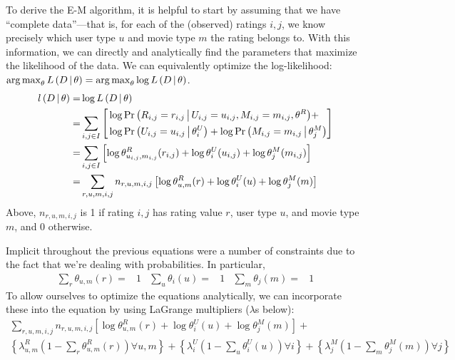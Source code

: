 \documentclass{article}
\begin{document}
To derive the E-M algorithm, it is helpful to start by assuming that
we have ``complete data''---that is, for each of the (observed)
ratings $i,j$, we know precisely which user type $u$ and movie type
$m$ the rating belongs to. With this information, we can directly and
analytically find the parameters that maximize the likelihood of the
data. We can equivalently optimize the log-likelihood: $\operatorname*{arg\,max}_\theta
{\ensuremath{ L \left( D \,\middle|\, \theta \right) }} = \operatorname*{arg\,max}_\theta \log {\ensuremath{ L \left( D \,\middle|\, \theta \right) }}$.
\begin{align}
  {\ensuremath{ l \left( D \,\middle|\, \theta \right) }} =& \log {\ensuremath{ L \left( D \,\middle|\, \theta \right) }} \\
  =& \sum_{i,j \in I} \left[
    \begin{aligned}
      & \log {{\Pr \left(  R_{i,j} = r_{i,j} \,\middle|\, U_{i,j} = u_{i,j}, M_{i,j} = m_{i,j},
        \theta^R  \right)}} + \\
      & \log {{\Pr \left(  U_{i,j} = u_{i,j} \,\middle|\, \theta^U_i  \right)}} +  \log {{\Pr \left(  M_{i,j} = m_{i,j} \,\middle|\, \theta^M_j  \right)}}
    \end{aligned}
  \right] \\
  =& \sum_{i,j \in I} \left[
    \log \theta^R_{u_{i,j},m_{i,j}}(r_{i,j}) +
    \log \theta^U_i(u_{i,j}) +
    \log \theta^M_j(m_{i,j})
  \right] \\
  =& \sum_{r,u,m,i,j} n_{r,u,m,i,j} \left[
    \log \theta^R_{u,m}(r) + \log \theta^U_i(u) + \log \theta^M_j(m)
  \right]
\end{align}
Above, $n_{r,u,m,i,j}$ is 1 if rating $i,j$ has rating value $r$, user
type $u$, and movie type $m$, and 0 otherwise.

Implicit throughout the previous equations were a number of
constraints due to the fact that we're dealing with probabilities. In
particular,
\begin{align}
\sum_r \theta_{u,m}(r) =& 1 &
\sum_u \theta_i(u) =& 1 &
\sum_m \theta_j(m) =& 1
\end{align}
To allow ourselves to optimize the equations analytically, we can
incorporate these into the equation by using LaGrange multipliers
($\lambda$s below):
\begin{multline}
  \sum_{r,u,m,i,j} n_{r,u,m,i,j} \left[
    \log \theta^R_{u,m}(r) + \log \theta^U_i(u) + \log \theta^M_j(m)
  \right] + \\
  \left\{
    \lambda^R_{u,m} \left( 1 - \sum_r \theta^R_{u,m}(r) \right)
    \forall u,m 
  \right\} +
  \left\{
    \lambda^U_i \left( 1 - \sum_u \theta^U_i(u) \right)
    \forall i 
  \right\} +
  \left\{
    \lambda^M_j \left( 1 - \sum_m \theta^M_j(m) \right)
    \forall j
  \right\}
\end{multline}
\end{document}
